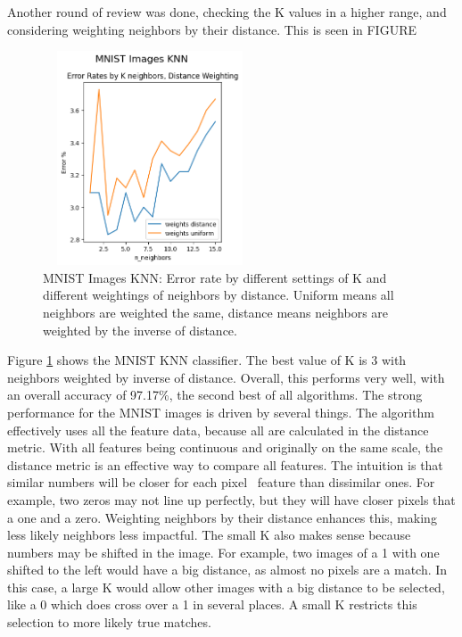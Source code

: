 \documentclass[letterpaper]{article} %
\begin{document}
Another round of review was done, checking the K values in a higher range, and considering weighting neighbors by their distance.  This is seen in FIGURE

\begin{figure}[h]
\centering
\includegraphics[width=2.5in, height=2.5in]{figures/MNIST_Images_KNN_knn_1.png}
\caption{MNIST Images KNN:  Error rate by different settings of K and different weightings of neighbors by distance.  Uniform means all neighbors are weighted the same, distance means neighbors are weighted by the inverse of distance.  }
\label{fig:mnist_knn_1}
\end{figure}

Figure \ref{fig:mnist_knn_1} shows the MNIST KNN classifier.  The best value of K is 3 with neighbors weighted by inverse of distance.  Overall, this performs very well, with an overall accuracy of 97.17\%, the second best of all algorithms.  The strong performance for the MNIST images is driven by several things.  The algorithm effectively uses all the feature data, because all are calculated in the distance metric.  With all features being continuous and originally on the same scale, the distance metric is an effective way to compare all features.  The intuition is that similar numbers will be closer for each pixel \ feature than dissimilar ones.  For example, two zeros may not line up perfectly, but they will have closer pixels that a one and a zero.  Weighting neighbors by their distance enhances this, making less likely neighbors less impactful.   The small K also makes sense because numbers may be shifted in the image. For example, two images of a 1 with one shifted to the left would have a big distance, as almost no pixels are a match.  In this case, a large K would allow other images with a big distance to be selected, like a 0 which does cross over a 1 in several places.  A small K restricts this selection to more likely true matches.
\end{document}
